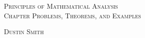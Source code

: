 \documentclass[dvipsnames,svgnames,x11names]{scrbook}%
\begin{document}
\pagecolor{PaleGreen1}
\begin{center}
  \begin{center}
  \vspace*{\fill}
  \textsc{\LARGE Principles of Mathematical Analysis\\Chapter Problems, Theorems, and Examples}
  \bigskip

  \textsc{\LARGE Dustin Smith}
  \vspace*{\fill}
\end{center}
\end{center}

\newpage

\tableofcontents

\newpage


\end{document}
